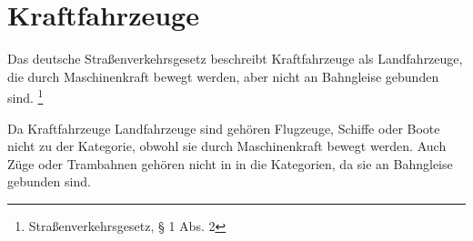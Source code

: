 \section{Kraftfahrzeuge}
Das deutsche Straßenverkehrsgesetz beschreibt Kraftfahrzeuge als Landfahrzeuge, die durch Maschinenkraft bewegt werden, aber nicht an Bahngleise gebunden sind.
\footnote{Straßenverkehrsgesetz, § 1 Abs. 2}



Da Kraftfahrzeuge Landfahrzeuge sind gehören Flugzeuge, Schiffe oder Boote nicht zu der Kategorie, obwohl sie durch Maschinenkraft bewegt werden.
Auch Züge oder Trambahnen gehören nicht in in die Kategorien, da sie an Bahngleise gebunden sind.








